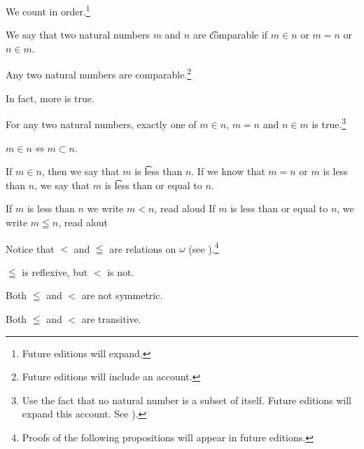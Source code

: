 

We count in order.\footnote{Future editions will expand.}


We say that two natural numbers $m$ and $n$ are \t{comparable} if $m \in n$ or $m = n$ or $n \in m$.

\begin{proposition}
	Any two natural numbers are comparable.\footnote{Future editions will include an account.}
\end{proposition}

In fact, more is true.

\begin{proposition}
	For any two natural numbers, exactly one of $m \in n$, $m = n$ and $n \in m$ is true.\footnote{Use the fact that no natural number is a subset of itself. Future editions will expand this account. See ).}
\end{proposition}

\begin{proposition}
	$m \in n \iff m \subset n$.
\end{proposition}

If $m \in n$, then we say that $m$ is \t{less than} $n$.
If we know that $m = n$ or $m$ is less than $n$, we say that $m$ is \t{less than or equal to} $n$.


If $m$ is less than $n$ we write $m < n$, read aloud 
If $m$ is less than or equal to $n$, we write $m \leqq n$, read alout 


Notice that $<$ and $\leqq$ are relations on $\omega$ (see ).\footnote{Proofs of the following propositions will appear in future editions.}

\begin{proposition}[Reflexivity]
	$\leqq$ is reflexive, but
	$<$ is not.
\end{proposition}

\begin{proposition}[Symmetry]
	Both $\leqq$ and $<$ are not symmetric.
\end{proposition}

\begin{proposition}[Transitivity]
	Both $\leqq$ and $<$ are transitive.
\end{proposition}

